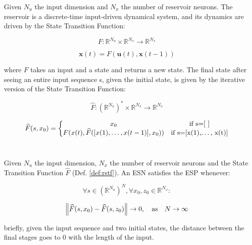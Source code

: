 \begin{definition}\label{def:rstf}
Given $N_u$ the input dimension and $N_x$ the number of reservoir neurons. The reservoir is a discrete-time input-driven dynamical system, and its dynamics are driven by the State Transition Function:

\begin{equation}\nonumber
    F:\mathbb{R}^{N_u} \times \mathbb{R}^{N_x} \rightarrow \mathbb{R}^{N_x}
\end{equation}

\begin{equation}
    \textbf{x}(t)=F(\textbf{u}(t), \textbf{x}(t-1))
\end{equation}

where $F$ takes an input and a state and returns a new state. The final state after seeing an entire input sequence s, given the initial state, is given by the iterative version of the State Transition Function:

\begin{equation}\nonumber
    \widehat{F}:(\mathbb{R}^{N_u})^* \times \mathbb{R}^{N_x} \rightarrow \mathbb{R}^{N_x}
\end{equation}

\begin{equation}
    \widehat{F}(s,x_0)=\left\{\begin{matrix}x_0 & \textup{if s=[ ]}\\F(x(t), \widehat{F}([x(1),\dots, x(t-1)],x_0)) & \textup{if s=[x(1),\dots, x(t)]}
\end{matrix}\right.
\end{equation} \\
\end{definition}


\begin{definition}\label{def:esp}
Given $N_u$ the input dimension, $N_x$ the number of reservoir neurons and the State Transition Function $\widehat{F}$ (Def. \ref{def:rstf}). An ESN satisfies the ESP whenever:

\begin{equation}\nonumber
    \forall s \in (\mathbb{R}^{N_u})^N, \forall x_0,z_0 \in \mathbb{R}^{N_x}:
\end{equation}

\begin{equation}
    \left\| \widehat{F}(s, x_0)-\widehat{F}(s, z_0) \right\| \rightarrow 0, \text{\quad as\quad} N \rightarrow \infty
\end{equation}

briefly, given the input sequence and two initial states, the distance between the final stages goes to 0 with the length of the input. \\
\end{definition}


